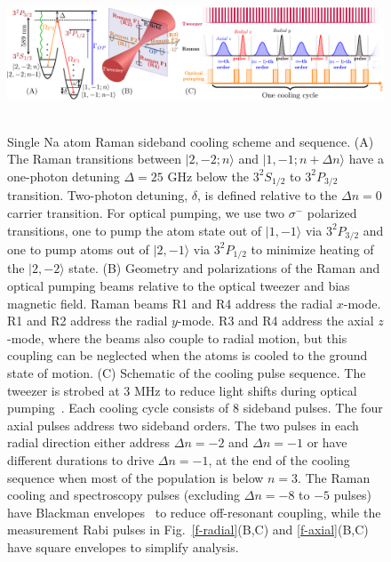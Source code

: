\documentclass[aps,prl,twocolumn,groupedaddress]{revtex4-1}
\begin{document}
\begin{figure}
  \includegraphics[height=4.5cm]{fig1_combined.pdf}
  \caption{Single Na atom Raman sideband cooling scheme and sequence. (A)
    The Raman transitions between $|2,-2;n\rangle$ and $|1,-1;n+\Delta n\rangle$ have a one-photon detuning $\Delta=25$ GHz below the $3^2S_{1/2}$ to $3^2P_{3/2}$ transition. Two-photon detuning, $\delta$, is defined relative to the $\Delta n=0$ carrier transition. For optical pumping, we use two $\sigma^-$ polarized transitions, one to pump the atom state out of $|1,-1\rangle$ via $3^2P_{3/2}$ and one to pump atoms out of $|2,-1\rangle$ via $3^2P_{1/2}$
     to minimize heating of the $|2,-2\rangle$ state.
    (B) Geometry and polarizations of the Raman and optical pumping beams relative to the
    optical tweezer and bias magnetic field.  Raman beams R1 and R4 address the radial $x$-mode. R1 and R2 address the radial $y$-mode.  R3 and R4 address the axial $z$-mode, where the beams also couple to radial motion, but this coupling can be neglected when the atoms is cooled to the ground state of motion.
    (C) Schematic of the cooling pulse sequence. The tweezer is strobed at 3 MHz to
    reduce light shifts during optical pumping~\cite{Hutzler2017-LightShifts}.
    Each cooling cycle consists of $8$ sideband pulses.
    The four axial pulses address two sideband orders.
    The two pulses in each radial direction either address $\Delta n=-2$ and $\Delta n=-1$
    or have different durations to drive $\Delta n=-1$, at the end of the cooling sequence when most of the population is below $n=3$.
    The Raman cooling and spectroscopy pulses (excluding $\Delta n=-8$ to $-5$ pulses) have Blackman envelopes~\cite{Kasevich1992}
    to reduce off-resonant coupling,
    while the measurement Rabi pulses in Fig.~\ref{f-radial}(B,C) and \ref{f-axial}(B,C)
    have square envelopes to simplify analysis.
    \label{f-setup}}
\end{figure}
\end{document}
